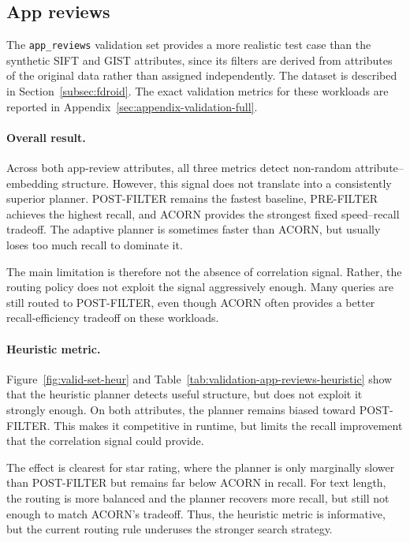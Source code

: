 \subsection{App reviews}\label{subsec:app-reviews}

The \texttt{app\_reviews} validation set provides a more realistic test case than the synthetic SIFT and GIST attributes, since its filters are derived from attributes of the original data rather than assigned independently.
The dataset is described in Section~\ref{subsec:fdroid}.
The exact validation metrics for these workloads are reported in Appendix~\ref{sec:appendix-validation-full}.

\paragraph{Overall result.}

Across both app-review attributes, all three metrics detect non-random attribute--embedding structure.
However, this signal does not translate into a consistently superior planner.
POST-FILTER remains the fastest baseline, PRE-FILTER achieves the highest recall, and ACORN provides the strongest fixed speed--recall tradeoff.
The adaptive planner is sometimes faster than ACORN, but usually loses too much recall to dominate it.

The main limitation is therefore not the absence of correlation signal.
Rather, the routing policy does not exploit the signal aggressively enough.
Many queries are still routed to POST-FILTER, even though ACORN often provides a better recall-efficiency tradeoff on these workloads.

\paragraph{Heuristic metric.}

Figure~\ref{fig:valid-set-heur} and Table~\ref{tab:validation-app-reviews-heuristic} show that the heuristic planner detects useful structure, but does not exploit it strongly enough.
On both attributes, the planner remains biased toward POST-FILTER.
This makes it competitive in runtime, but limits the recall improvement that the correlation signal could provide.

The effect is clearest for star rating, where the planner is only marginally slower than POST-FILTER but remains far below ACORN in recall.
For text length, the routing is more balanced and the planner recovers more recall, but still not enough to match ACORN's tradeoff.
Thus, the heuristic metric is informative, but the current routing rule underuses the stronger search strategy.

